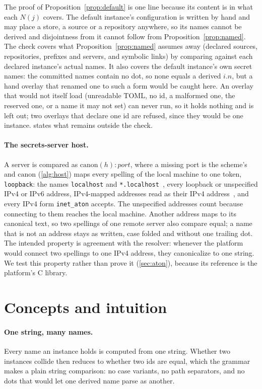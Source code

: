 \documentclass[11pt]{article}
\theoremstyle{plain}
\theoremstyle{definition}
\theoremstyle{remark}
\begin{document}
The proof of Proposition~\ref{prop:default} is one line because its content is in what each
$N(j)$ covers. The default instance's configuration is written by hand and may place a store, a
source or a repository anywhere, so its names cannot be derived and disjointness from it cannot
follow from Proposition~\ref{prop:named}. The check covers what Proposition~\ref{prop:named}
assumes away (declared sources, repositories, prefixes and servers, and symbolic links) by comparing
against each declared instance's actual names. It also covers the default instance's own secret
names: the committed names contain no dot, so none equals a derived $i.n$, but a hand overlay that
renamed one to such a form would be caught here. An overlay that would not itself load (unreadable
TOML, no id, a malformed one, the reserved one, or a name it may not set) can never run, so it holds
nothing and is left out; two overlays that declare one id are refused, since they would be one
instance.  states what remains outside the check.

\paragraph{The secrets-server host.} A server is compared as $\mathrm{canon}(h){:}\mathit{port}$,
where a missing port is the scheme's and $\mathrm{canon}$ (\cref{alg:host}) maps every spelling of
the local machine to one token, \texttt{loopback}: the names \texttt{localhost} and
\texttt{*.localhost}~\cite{rfc6761}, every loopback or unspecified IPv4 or IPv6 address,
IPv4-mapped addresses read as their IPv4 address~\cite{rfc4291}, and every IPv4 form
\texttt{inet\_aton} accepts. The unspecified addresses count because connecting to them reaches the
local machine. Another address maps to its canonical text, so two spellings of one remote server
also compare equal; a name that is not an address stays as written, case folded and without one
trailing dot. The intended property is agreement with the resolver: whenever the platform would
connect two spellings to one IPv4 address, they canonicalize to one string. We test this property
rather than prove it (\cref{sec:aton}), because its reference is the platform's C library.

\section{Concepts and intuition}\label{sec:concepts}

\paragraph{One string, many names.} Every name an instance holds is computed from one string.
Whether two instances collide then reduces to whether two ids are equal, which the grammar makes a
plain string comparison: no case variants, no path separators, and no dots that would let one
derived name parse as another.
\end{document}

